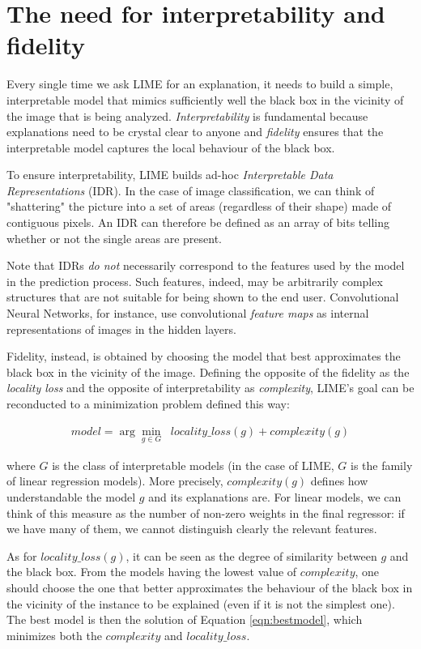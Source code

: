\documentclass[12pt, twoside, a4paper]{report}
\begin{document}
\section{The need for interpretability and fidelity}

Every single time we ask LIME for an explanation, it needs to build a simple, interpretable model that mimics sufficiently well the black box in the vicinity of the image that is being analyzed. 
\textit{Interpretability} is fundamental because explanations need to be crystal clear to anyone and \textit{fidelity} ensures that the interpretable model captures the local behaviour of the black box.

To ensure interpretability, LIME builds ad-hoc \textit{Interpretable Data Representations} (IDR). In the case of image classification, we can think of "shattering" the picture into a set of areas (regardless of their shape) made of contiguous pixels. An IDR can therefore be defined as an array of bits telling whether or not the single areas are present.

Note that IDRs \textit{do not} necessarily correspond to the features used by the model in the prediction process. 
Such features, indeed, may be arbitrarily complex structures that are not suitable for being shown to the end user. Convolutional Neural Networks, for instance, use convolutional \textit{feature maps} as internal representations of images in the hidden layers.

Fidelity, instead, is obtained by choosing the model that best approximates the black box in the vicinity of the image. Defining the opposite of the fidelity as the \textit{locality loss} and the opposite of interpretability as \textit{complexity}, LIME's goal can be reconducted to a minimization problem defined this way:

\begin{eqnarray}
model = \arg\min_{g \in G} \;\; locality\_loss(g) + complexity(g)
\label{eqn:bestmodel}
\end{eqnarray}

where $G$ is the class of interpretable models (in the case of LIME, $G$ is the family of linear regression models). More precisely, $complexity(g)$ defines how understandable the model $g$ and its explanations are. For linear models, we can think of this measure as the number of non-zero weights in the final regressor: if we have many of them, we cannot distinguish clearly the relevant features.

As for $locality\_loss(g)$, it can be seen as the degree of similarity between $g$ and the black box. From the models having the lowest value of $complexity$, one should choose the one that better approximates the behaviour of the black box in the vicinity of the instance to be explained (even if it is not the simplest one). The best model is then the solution of Equation \ref{eqn:bestmodel}, which minimizes both the $complexity$ and $locality\_loss$.
\end{document}
